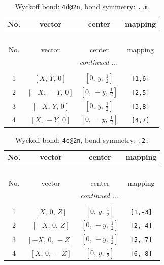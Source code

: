 \documentclass[fleqn,8pt]{jsarticle}
\begin{document}
\begin{longtable}{cccc}
\caption{Wyckoff bond: {\tt 4d@2n}, bond symmetry: {\tt ..m}}
 \\
 \hline \hline
No. & vector & center & mapping \\ \hline \endfirsthead

\multicolumn{3}{l}{\tablename\ \thetable{}} \\
 \hline \hline
No. & vector & center & mapping \\ \hline \endhead

 \hline \hline
\multicolumn{3}{r}{\footnotesize\it continued ...} \\ \endfoot

 \hline \hline
\multicolumn{3}{r}{} \\ \endlastfoot

1 & $\left[ X,\, Y,\, 0 \right]$ & $\left[ 0,\, y,\, \frac{1}{2} \right]$ & {\tt [1,6]} \\ \hline
2 & $\left[ - X,\, - Y,\, 0 \right]$ & $\left[ 0,\, - y,\, \frac{1}{2} \right]$ & {\tt [2,5]} \\ \hline
3 & $\left[ - X,\, Y,\, 0 \right]$ & $\left[ 0,\, y,\, \frac{1}{2} \right]$ & {\tt [3,8]} \\ \hline
4 & $\left[ X,\, - Y,\, 0 \right]$ & $\left[ 0,\, - y,\, \frac{1}{2} \right]$ & {\tt [4,7]} \\
\end{longtable}
\renewcommand{\arraystretch}{1.2}
\begin{longtable}{cccc}
\caption{Wyckoff bond: {\tt 4e@2n}, bond symmetry: {\tt .2.}}
 \\
 \hline \hline
No. & vector & center & mapping \\ \hline \endfirsthead

\multicolumn{3}{l}{\tablename\ \thetable{}} \\
 \hline \hline
No. & vector & center & mapping \\ \hline \endhead

 \hline \hline
\multicolumn{3}{r}{\footnotesize\it continued ...} \\ \endfoot

 \hline \hline
\multicolumn{3}{r}{} \\ \endlastfoot

1 & $\left[ X,\, 0,\, Z \right]$ & $\left[ 0,\, y,\, \frac{1}{2} \right]$ & {\tt [1,-3]} \\ \hline
2 & $\left[ - X,\, 0,\, Z \right]$ & $\left[ 0,\, - y,\, \frac{1}{2} \right]$ & {\tt [2,-4]} \\ \hline
3 & $\left[ - X,\, 0,\, - Z \right]$ & $\left[ 0,\, - y,\, \frac{1}{2} \right]$ & {\tt [5,-7]} \\ \hline
4 & $\left[ X,\, 0,\, - Z \right]$ & $\left[ 0,\, y,\, \frac{1}{2} \right]$ & {\tt [6,-8]} \\
\end{longtable}
\end{document}
